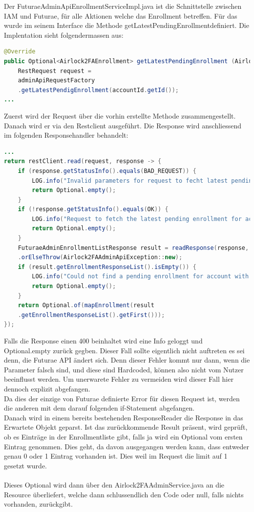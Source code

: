 Der FuturaeAdminApiEnrollmentServiceImpl.java ist die Schnittstelle zwischen IAM und Futurae, für alle Aktionen welche das Enrollment betreffen. Für das wurde im seinem Interface die Methode \flqq getLatestPendingEnrollment\frqq definiert. Die Implentation sieht folgendermassen aus:
\begin{lstlisting}[language=Java]
@Override
public Optional<Airlock2FAEnrollment> getLatestPendingEnrollment (Airlock2FAAccountId accountId) {
	RestRequest request = 
	adminApiRequestFactory
	.getLatestPendigEnrollment(accountId.getId());
...
\end{lstlisting}
Zuerst wird der Request über die vorhin erstellte Methode zusammengestellt.
Danach wird er via den Restclient ausgeführt. Die Response wird anschliessend im folgenden Responsehandler behandelt:
\begin{lstlisting}[language=Java]
...
return restClient.read(request, response -> {
	if (response.getStatusInfo().equals(BAD_REQUEST)) {
		LOG.info("Invalid parameters for request to fecht latest pending enrollment for account with id: " + accountId.getId());
		return Optional.empty();
	}
	if (!response.getStatusInfo().equals(OK)) {
		LOG.info("Request to fetch the latest pending enrollment for account with id '" + accountId.getId() + "' failed with code: " + response.getStatusInfo());
		return Optional.empty();
	}
	FuturaeAdminEnrollmentListResponse result = readResponse(response, FuturaeAdminEnrollmentListResponse.class, request)
	.orElseThrow(Airlock2FAAdminApiException::new);
	if (result.getEnrollmentResponseList().isEmpty()) {
		LOG.info("Could not find a pending enrollment for account with id: " + accountId.getId());
		return Optional.empty();
	}
	return Optional.of(mapEnrollment(result
	.getEnrollmentResponseList().getFirst()));
});
\end{lstlisting}
Falls die Response einen 400 beinhaltet wird eine Info geloggt und Optional.empty zurück gegben. Dieser Fall sollte eigentlich nicht auftreten es sei denn, die Futurae API ändert sich. Denn dieser Fehler kommt nur dann, wenn die Parameter falsch sind, und diese sind Hardcoded, können also nicht vom Nutzer beeinflusst werden. Um unerwarete Fehler zu vermeiden wird dieser Fall hier dennoch explizit abgefangen.\\
Da dies der einzige von Futurae definierte Error für diesen Request ist, werden die anderen mit dem darauf folgenden if-Statement abgefangen.\\
Danach wird in einem bereits bestehenden ResponseReader die Response in das Erwartete Objekt geparst. Ist das zurückkommende Result präsent, wird geprüft, ob es Einträge in der Enrollmentliste gibt, falls ja wird ein Optional vom ersten Eintrag genommen. Dies geht, da davon ausgegangen werden kann, dass entweder genau 0 oder 1 Eintrag vorhanden ist. Dies weil im Request die limit auf 1 gesetzt wurde.\\
\\
Dieses Optional wird dann über den Airlock2FAAdminService.java an die Resource überliefert, welche dann schlussendlich den Code oder null, falls nichts vorhanden, zurückgibt.
